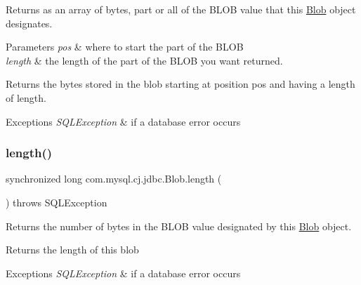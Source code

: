 Returns as an array of bytes, part or all of the B\+L\+OB value that this \mbox{\hyperlink{classcom_1_1mysql_1_1cj_1_1jdbc_1_1_blob}{Blob}} object designates.


\begin{DoxyParams}{Parameters}
{\em pos} & where to start the part of the B\+L\+OB \\
\hline
{\em length} & the length of the part of the B\+L\+OB you want returned.\\
\hline
\end{DoxyParams}
\begin{DoxyReturn}{Returns}
the bytes stored in the blob starting at position {\ttfamily pos} and having a length of {\ttfamily length}.
\end{DoxyReturn}

\begin{DoxyExceptions}{Exceptions}
{\em S\+Q\+L\+Exception} & if a database error occurs \\
\hline
\end{DoxyExceptions}
\mbox{\label{classcom_1_1mysql_1_1cj_1_1jdbc_1_1_blob_a21cf04a4632ad74337cf8a867bae61e3}} 
\subsubsection{\texorpdfstring{length()}{length()}}
{\footnotesize\ttfamily synchronized long com.\+mysql.\+cj.\+jdbc.\+Blob.\+length (\begin{DoxyParamCaption}{ }\end{DoxyParamCaption}) throws S\+Q\+L\+Exception}

Returns the number of bytes in the B\+L\+OB value designated by this \mbox{\hyperlink{classcom_1_1mysql_1_1cj_1_1jdbc_1_1_blob}{Blob}} object.

\begin{DoxyReturn}{Returns}
the length of this blob
\end{DoxyReturn}

\begin{DoxyExceptions}{Exceptions}
{\em S\+Q\+L\+Exception} & if a database error occurs \\
\hline
\end{DoxyExceptions}
\mbox{\label{classcom_1_1mysql_1_1cj_1_1jdbc_1_1_blob_a8894fdeb0a15e17b7375c5234b4bb1b2}} 

